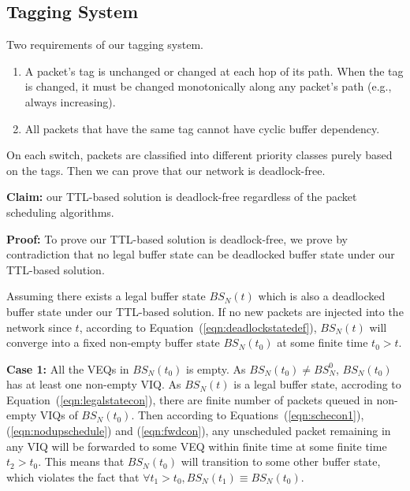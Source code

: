 \subsection{Tagging System}

Two requirements of our tagging system.

\begin{enumerate}

	\item A packet's tag is unchanged or changed at each hop of its path. When the tag is changed, it must be changed monotonically along any packet’s path (e.g., always increasing).

	\item All packets that have the same tag cannot have cyclic buffer dependency.

\end{enumerate}

On each switch, packets are classified into different priority classes purely based on the tags. Then we can prove that our network is deadlock-free.


 

\textbf{Claim:} our TTL-based solution is deadlock-free regardless of the packet scheduling algorithms.

\textbf{Proof:} To prove our TTL-based solution is deadlock-free, we prove by contradiction that no legal buffer state can be deadlocked buffer state under our TTL-based solution.

Assuming there exists a legal buffer state  $BS_N(t)$ which is also a deadlocked buffer state under our TTL-based solution. If no new packets are injected into the network since $t$, according to Equation~(\ref{eqn:deadlockstatedef}), $BS_N(t)$ will converge into a fixed non-empty buffer state $BS_N(t_0)$ at some finite time $t_0>t$. 


\textbf{Case 1:} All the VEQs in $BS_N(t_0)$ is empty. As $BS_N(t_0) \neq BS^0_N$, $BS_N(t_0)$ has at least one non-empty VIQ. As $BS_N(t)$ is a legal buffer state, accroding to Equation~(\ref{eqn:legalstatecon}), there are finite number of packets queued in non-empty VIQs of $BS_N(t_0)$. Then according to Equations~(\ref{eqn:schecon1}), (\ref{eqn:nodupschedule}) and (\ref{eqn:fwdcon}), any unscheduled packet remaining in any VIQ will be forwarded to some VEQ within finite time at some finite time $t_2>t_0$. This means that $BS_N(t_0)$ will transition to some other buffer state, which violates the fact that $\forall t_1>t_0, BS_N(t_1)\equiv BS_N(t_0)$.


